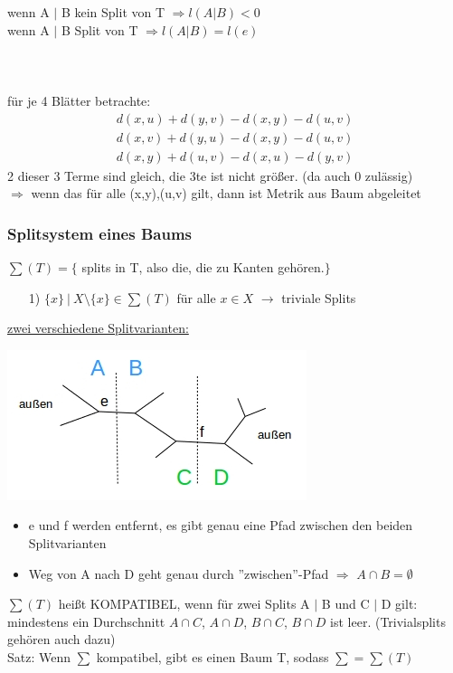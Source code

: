 wenn A $|$ B kein Split von T $\Rightarrow l(A|B) < 0$\\
wenn A $|$ B Split von T $\Rightarrow l(A|B) = l(e)$ 
\\\\
\\\\
für je 4 Blätter betrachte:\\
\begin{align*}
 	d(x,u) + d(y,v) - d(x,y) - d(u,v)\\
 	d(x,v) + d(y,u) - d(x,y) - d(u,v)\\
 	d(x,y) + d(u,v) - d(x,u) - d(y,v)
\end{align*}
2 dieser 3 Terme sind gleich, die 3te ist nicht größer. (da auch 0 zulässig)\\
$\Rightarrow$ wenn das für alle (x,y),(u,v) gilt, dann ist Metrik aus Baum abgeleitet

\newpage
\subsubsection{Splitsystem eines Baums}

$\sum (T) = \{$ splits in T, also die, die zu Kanten gehören.$\}$

\begin{enumerate}
	\item[1)] $ \{ x \}~|~X \setminus \{ x \} \in \sum (T)$ für alle $x \in X$ $\rightarrow$ triviale Splits
\end{enumerate}

\underline{zwei verschiedene Splitvarianten:}
\begin{center}
	\includegraphics[scale=1.25]{lectures/161209/pix/pic9.jpg}
\end{center}
\begin{itemize}
	\item e und f werden entfernt, es gibt genau eine Pfad zwischen den beiden Splitvarianten
	\item Weg von A nach D geht genau durch ''zwischen''-Pfad $\Rightarrow$ $A \cap B = \emptyset$
\end{itemize}

$\sum (T)$ heißt KOMPATIBEL, wenn für zwei Splits A $|$ B und C $|$ D gilt:\\
mindestens ein Durchschnitt $A \cap C$, $A \cap D$, $B \cap C$, $B \cap D$ ist leer. (Trivialsplits gehören auch dazu)\\

Satz: Wenn $\sum$ kompatibel, gibt es einen Baum T, sodass $\sum = \sum(T)$